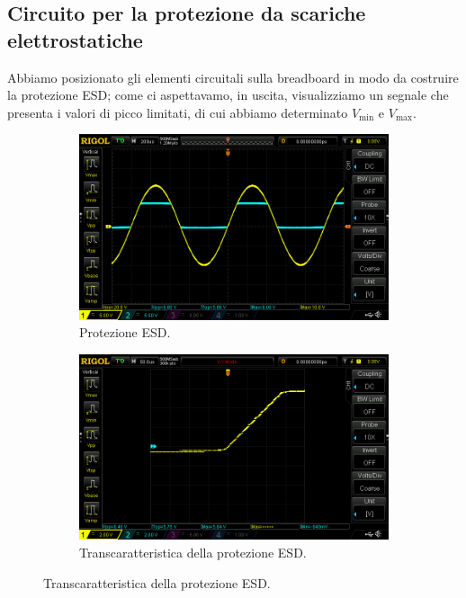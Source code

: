 \documentclass[a4paper]{article}
\begin{document}
		\subsection{Circuito per la protezione da scariche elettrostatiche}
			Abbiamo posizionato gli elementi circuitali sulla breadboard in modo da costruire la protezione ESD; come ci aspettavamo, in uscita, visualizziamo un segnale che presenta i valori di picco limitati, di cui abbiamo determinato $ V_{\mathrm{min}} $ e $ V_{\mathrm{max}} $.
			\begin{figure}[h!]
				\centering
				\begin{subfigure}{0.4\textwidth}
					\centering
					\includegraphics[scale=0.2]{protezioneESD}
					\caption{Protezione ESD.}
				\end{subfigure}
				\begin{subfigure}{0.4\textwidth}
					\centering
					\includegraphics[scale=0.2]{protezioneESDTranscaratteristica}
					\caption{Transcaratteristica della protezione ESD.}
				\end{subfigure}
				\label{fig:protezioneESD}
			\end{figure}
\end{document}
